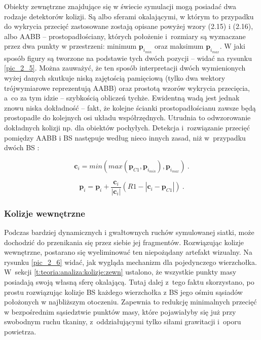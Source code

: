 				
				Obiekty zewnętrzne znajdujące się w świecie symulacji mogą posiadać dwa rodzaje detektorów kolizji. Są albo sferami okalającymi, w którym to przypadku do wykrycia przecięć zastosowane zostają opisane powyżej wzory (2.15) i (2.16), albo AABB -- prostopadłościany, których położenie i~rozmiary są wyznaczane przez dwa punkty w przestrzeni: minimum \(\mathbf{p}_{i_{min}}\) oraz maksimum \(\mathbf{p}_{i_{max}}\). W jaki sposób figury są tworzone na podstawie tych dwóch pozycji -- widać na rysunku \ref{pic_2_5}. Można zauważyć, że ten sposób interpretacji dwóch wymienionych wyżej danych skutkuje niską zajętością pamięciową (tylko dwa wektory trójwymiarowe reprezentują AABB) oraz prostotą wzorów wykrycia przecięcia, a~co za tym idzie -- szybkością obliczeń tychże. Ewidentną wadą jest jednak znowu niska dokładność -- fakt, że kolejne ścianki prostopadłościanu zawsze będą prostopadłe do kolejnych osi układu współrzędnych. Utrudnia to odwzorowanie dokładnych kolizji np. dla obiektów pochyłych. Detekcja i~rozwiązanie przecięć pomiędzy AABB i BS następuje według nieco innych zasad, niż w~przypadku dwóch BS \cite{wzory_sfera} \cite{wzory_sfera_box}:
				
				\begin{equation}
				\mathbf{c}_{i} =  min(max(\mathbf{p}_{C1}, \mathbf{p}_{i_{min}}), \mathbf{p}_{i_{max}})  \ .
				\end{equation}
				
				\begin{equation}
				\mathbf{p}_{i} = \mathbf{p}_{i} + \frac{\mathbf{c}_{i}}{|\mathbf{c}_{i}|}(R1 - |\mathbf{c}_{i} - \mathbf{p}_{C1}|) \ .
				\end{equation}
			
			\subsubsection{Kolizje wewnętrzne}
			\label{t:teoria:analiza:kolizje:wewn}
			
				
				Podczas bardziej dynamicznych i gwałtownych ruchów symulowanej siatki, może dochodzić do przenikania się przez siebie jej fragmentów. Rozwiązując kolizje wewnętrzne, postarano się wyeliminować ten niepożądany artefakt wizualny. Na rysunku \ref{pic_2_6} widać, jak wygląda mechanizm dla pojedynczego wierzchołka. W~sekcji \ref{t:teoria:analiza:kolizje:zewn} ustalono, że wszystkie punkty masy posiadają swoją własną sferę okalającą. Tutaj dalej z~tego faktu skorzystano, po prostu rozwiązując kolizje BS każdego wierzchołka z BS jego ośmiu sąsiadów położonych w najbliższym otoczeniu. Zapewnia to redukcję minimalnych przecięć w bezpośrednim sąsiedztwie punktów masy, które pojawiałyby się już przy swobodnym ruchu tkaniny, z~oddziałującymi tylko siłami grawitacji i~oporu powietrza.
				
